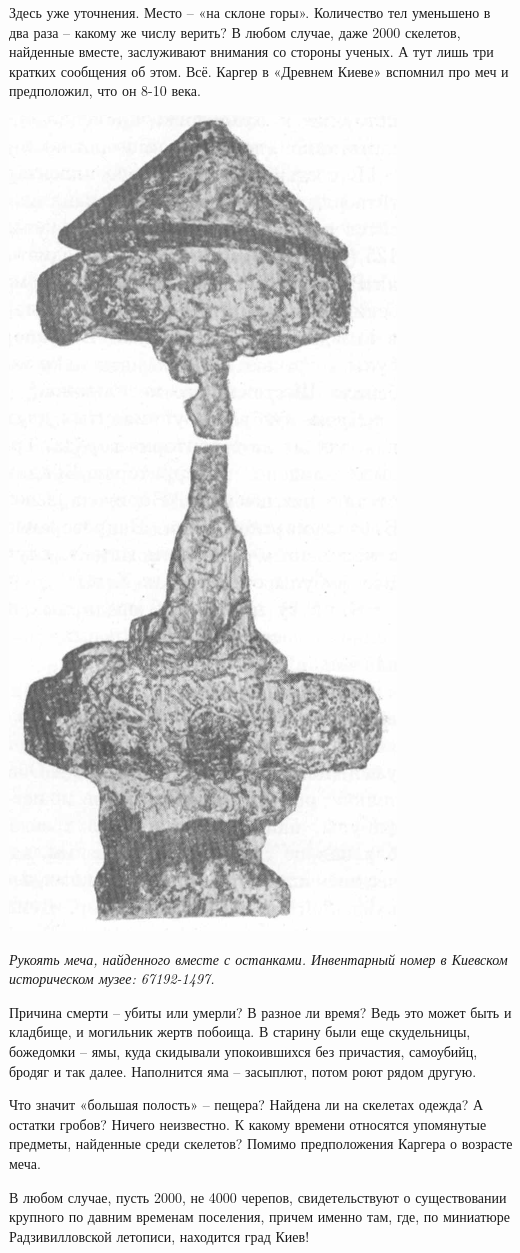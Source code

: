 Здесь уже уточнения. Место – «на склоне горы». Количество тел уменьшено в два раза – какому же числу верить? В любом случае, даже 2000 скелетов, найденные вместе, заслуживают внимания со стороны ученых. А тут лишь три кратких сообщения об этом. Всё. Каргер в «Древнем Киеве»\cite{karger01} вспомнил про меч и предположил, что он 8-10 века.

\begin{center}
\includegraphics[width=0.45\linewidth]{chast-kirvys/lys02/4000-mech.png}

\textit{Рукоять меча, найденного вместе с останками. Инвентарный номер в Киевском историческом музее: 67192-1497.}
\end{center}

Причина смерти – убиты или умерли? В разное ли время? Ведь это может быть и кладбище, и могильник жертв побоища. В старину были еще скудельницы, божедомки – ямы, куда скидывали упокоившихся без причастия, самоубийц, бродяг и так далее. Наполнится яма – засыплют, потом роют рядом другую. 

Что значит «большая полость» – пещера? Найдена ли на скелетах одежда? А остатки гробов? Ничего неизвестно. К какому времени относятся упомянутые предметы, найденные среди скелетов? Помимо предположения Каргера о возрасте меча.

В любом случае, пусть 2000, не 4000 черепов, свидетельствуют о существовании крупного по давним временам поселения, причем именно там, где, по миниатюре Радзивилловской летописи, находится град Киев!

